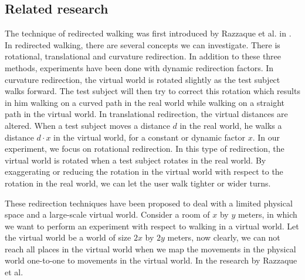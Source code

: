 \subsection{Related  research}
The technique of redirected walking was first introduced by Razzaque et al. in \cite{razzaque}. 
In redirected walking, there are several concepts we can investigate.
There is rotational, translational and curvature redirection.
In addition to these three methods, experiments have been done with dynamic redirection factors.\cite{neth}
In curvature redirection, the virtual world is rotated slightly as the test subject walks forward.
The test subject will then try to correct this rotation which results in him walking on a curved path in the real world while walking on a straight path in the virtual world.
In translational redirection, the virtual distances are altered.
When a test subject moves a distance $d$ in the real world, he walks a distance $d\cdot x$ in the virtual world, for a constant or dynamic factor $x$.
In our experiment, we focus on rotational redirection.
In this type of redirection, the virtual world is rotated when a test subject rotates in the real world.
By exaggerating or reducing the rotation in the virtual world with respect to the rotation in the real world, we can let the user walk tighter or wider turns.

These redirection techniques have been proposed to deal with a limited physical space and a large-scale virtual world.
Consider a room of $x$ by $y$ meters, in which we want to perform an experiment with respect to walking in a virtual world. 
Let the virtual world be a world of size $2x$ by $2y$ meters, now clearly, we can not reach all places in the virtual world when we map the movements in the physical world one-to-one to movements in the virtual world.
In the research by Razzaque et al. \cite{razzaque} 

